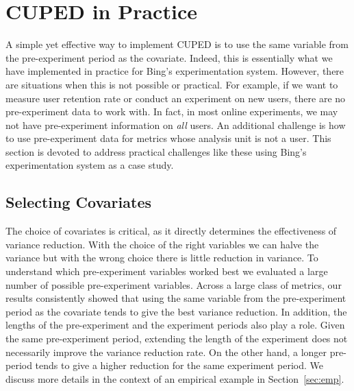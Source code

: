 \documentclass{sig-alternate}
\begin{document}
\section{CUPED in Practice}\label{sec:practice}

 
A simple yet effective way to implement CUPED is to use the same variable from the pre-experiment period as the covariate. 
Indeed, this is essentially what we have implemented in practice for Bing's experimentation system.  However, there are situations when this is not possible or practical. 
For example,  if we want to measure user retention rate or conduct an experiment on new users, there are no pre-experiment data to work with. In fact, in most online experiments, we may not have pre-experiment information on \textit{all} users. An additional challenge is how to use pre-experiment data for metrics whose analysis unit is not a user. This section is devoted to address practical challenges like these using Bing's experimentation system as a case study. 

\subsection{Selecting Covariates}
The choice of covariates is critical, as it directly determines the effectiveness of variance reduction. With the choice of the right variables we can halve the variance but with the wrong choice there is little reduction in variance. To understand which pre-experiment variables worked best we evaluated a large number of possible pre-experiment variables. Across a large class of metrics, our results consistently showed that using the same variable from the pre-experiment period as the covariate tends to give the best variance reduction. In addition, the lengths of the pre-experiment and the experiment periods also play a role. Given the same pre-experiment period, extending the length of the experiment does not necessarily improve the variance reduction rate. On the other hand, a longer pre-period tends to give a higher reduction for the same experiment period. We discuss more details in the context of an empirical example in Section~\ref{sec:emp}.   
\end{document}
